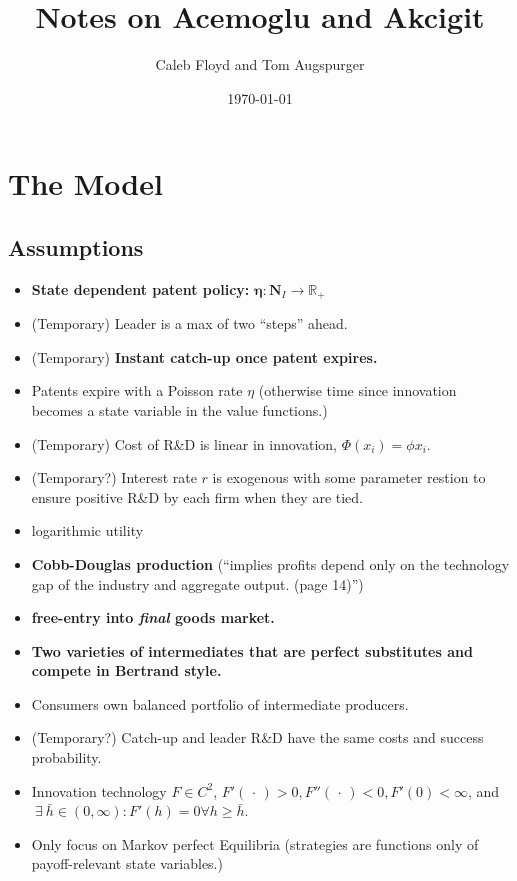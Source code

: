 \documentclass[11pt]{article}
\title{Notes on Acemoglu and Akcigit}
\author{Caleb Floyd and Tom Augspurger}
\date{\today}
\begin{document}
\maketitle

\section{The Model}
\label{sec:the_model}

\subsection{Assumptions}
\label{sub:assumptions}

  \begin{itemize}
    \item \textbf{State dependent patent policy:} $\bm{\eta} : \bm{N}_I \rightarrow \mathbb{R_+}$
    \item (Temporary) Leader is a max of two ``steps'' ahead.
    \item (Temporary) \textbf{Instant catch-up once patent expires.}
    \item Patents expire with a Poisson rate $\eta$ (otherwise time since innovation becomes a state variable in the value functions.)
    \item (Temporary) Cost of R\&D is linear in innovation, $\Phi(x_i) = \phi x_i$.
    \item (Temporary?) Interest rate $r$ is exogenous with some parameter restion to ensure positive R\&D by each firm when they are tied.
    \item logarithmic utility
    \item \textbf{Cobb-Douglas production} (``implies profits depend only on the technology gap of the industry and aggregate output. (page 14)'')
    \item \textbf{free-entry into \emph{final} goods market.}
    \item \textbf{Two varieties of intermediates that are perfect substitutes and compete in Bertrand style.}
    \item Consumers own balanced portfolio of intermediate producers.
    \item (Temporary?) Catch-up and leader R\&D have the same costs and success probability.
    \item Innovation technology $F \in C^2$, $F'(\,\cdot\,) > 0, F''(\,\cdot\,) < 0, F'(0) < \infty$, and $\ \exists\ \bar{h} \in (0, \infty) : F'(h) = 0 \forall h \geq \bar{h}$.
    \item Only focus on Markov perfect Equilibria (strategies are functions only of payoff-relevant state variables.)
  \end{itemize}
\end{document}
